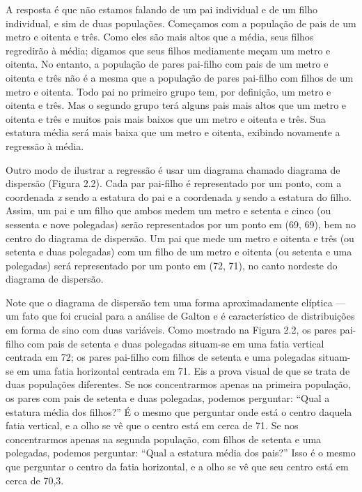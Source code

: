 \documentclass[11pt,a5paper,twoside]{book}
\begin{document}
A resposta é que não estamos falando de um pai individual e de um filho individual, e sim de duas populações. Começamos com a população de pais de um metro e oitenta e três. Como eles são mais altos que a média, seus filhos regredirão à média; digamos que seus filhos mediamente meçam um metro e oitenta. No entanto, a população de pares pai-filho com pais de um metro e oitenta e três não é a mesma que a população de pares pai-filho com filhos de um metro e oitenta. Todo pai no primeiro grupo tem, por definição, um metro e oitenta e três. Mas o segundo grupo terá alguns pais mais altos que um metro e oitenta e três e muitos pais mais baixos que um metro e oitenta e três. Sua estatura média será mais baixa que um metro e oitenta, exibindo novamente a regressão à média.

Outro modo de ilustrar a regressão é usar um diagrama chamado diagrama de dispersão (Figura 2.2). Cada par pai-filho é representado por um ponto, com a coordenada \textit{x} sendo a estatura do pai e a coordenada \textit{y} sendo a estatura do filho. Assim, um pai e um filho que ambos medem um metro e setenta e cinco (ou sessenta e nove polegadas) serão representados por um ponto em (69, 69), bem no centro do diagrama de dispersão. Um pai que mede um metro e oitenta e três (ou setenta e duas polegadas) com um filho de um metro e oitenta (ou setenta e uma polegadas) será representado por um ponto em (72, 71), no canto nordeste do diagrama de dispersão.

Note que o diagrama de dispersão tem uma forma aproximadamente elíptica — um fato que foi crucial para a análise de Galton e é característico de distribuições em forma de sino com duas variáveis. Como mostrado na Figura 2.2, os pares pai-filho com pais de setenta e duas polegadas situam-se em uma fatia vertical centrada em 72; os pares pai-filho com filhos de setenta e uma polegadas situam-se em uma fatia horizontal centrada em 71. Eis a prova visual de que se trata de duas populações diferentes. Se nos concentrarmos apenas na primeira população, os pares com pais de setenta e duas polegadas, podemos perguntar: “Qual a estatura média dos filhos?” É o mesmo que perguntar onde está o centro daquela fatia vertical, e a olho se vê que o centro está em cerca de 71. Se nos concentrarmos apenas na segunda população, com filhos de setenta e uma polegadas, podemos perguntar: “Qual a estatura média dos pais?” Isso é o mesmo que perguntar o centro da fatia horizontal, e a olho se vê que seu centro está em cerca de 70,3.
\end{document}
